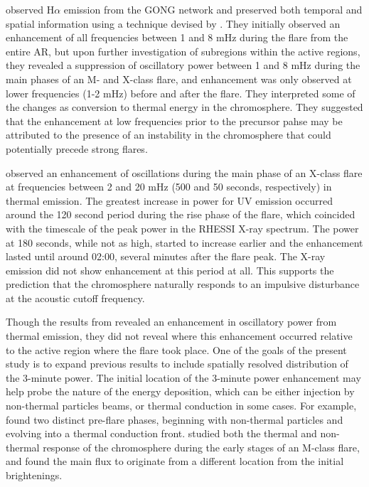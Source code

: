 \cite{Monsue2016} observed H$\alpha$ emission from the GONG network
and preserved both temporal and spatial information
using a technique devised by \cite{Jackiewicz2013}.
They initially observed an enhancement of all frequencies between
1 and 8 mHz during the flare from the entire AR,
but upon further investigation of subregions within the active regions,
they revealed a suppression of oscillatory power between 1 and 8 mHz
during the main phases of an M- and X-class flare,
and enhancement was only observed
at lower frequencies (1-2 mHz) before and after the flare.
They interpreted some of the changes as conversion to
thermal energy in the chromosphere.
They suggested that the enhancement at low frequencies
prior to the precursor pahse
may be attributed to the presence of an instability in the chromosphere
that could potentially precede strong flares.

\cite{Milligan2017}
observed an enhancement of oscillations during the main phase of an
X-class flare at frequencies between 2 and 20 mHz
(500 and 50 seconds, respectively) in thermal emission.
The greatest increase in power for UV emission
occurred around the 120 second period
during the rise phase of the flare, which coincided with the
timescale of the peak power in the RHESSI X-ray spectrum.
The power at 180 seconds, while not as high, started to increase earlier
and the enhancement lasted until around 02:00, several minutes after
the flare peak. The X-ray emission did not show enhancement at this
period at all.
This supports the prediction that the chromosphere naturally responds
to an impulsive disturbance at the acoustic cutoff frequency.

Though the results from \cite{Milligan2017} revealed an
enhancement in oscillatory power from thermal emission,
they did not reveal where this enhancement occurred relative to the
active region where the flare took place.
One of the goals of the present study is to expand previous results to
include spatially resolved distribution of the 3-minute power.
The initial location of the 3-minute power enhancement
may help probe the nature of the energy deposition, which can be
either injection by non-thermal particles beams, or
thermal conduction in some cases.
For example,
\cite{Awasthi2018} found two distinct pre-flare phases,
beginning with non-thermal particles and evolving into a
thermal conduction front.
\cite{Fletcher2013b} studied both the thermal and non-thermal response
of the chromosphere during the early stages of an M-class flare,
and found the main flux to originate from a different location from
the initial brightenings.

